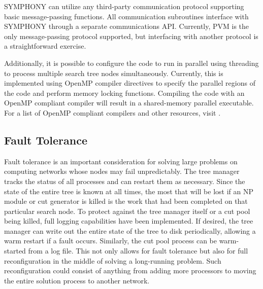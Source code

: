SYMPHONY can utilize any third-party communication protocol supporting basic
message-passing functions. All communication subroutines interface with
SYMPHONY through a separate communications API. Currently, PVM \cite{PVMbook}
is the only message-passing protocol supported, but interfacing with another
protocol is a straightforward exercise.

Additionally, it is possible to configure the code to run in parallel using
threading to process multiple search tree nodes simultaneously. Currently,
this is implemented using OpenMP compiler directives to specify the parallel
regions of the code and perform memory locking functions. Compiling the code
with an OpenMP compliant compiler will result in a shared-memory parallel
executable. For a list of OpenMP compliant compilers and other resources,
visit .

\subsection{Fault Tolerance}
\label{fault-tolerance} 

Fault tolerance is an important consideration for solving large problems on
computing networks whose nodes may fail unpredictably. The tree manager tracks
the status of all processes and can restart them as necessary. Since the state
of the entire tree is known at all times, the most that will be lost if an NP
module or cut generator is killed is the work that had been completed on that
particular search node. To protect against the tree manager itself or a cut
pool being killed, full logging capabilities have been implemented. If
desired, the tree manager can write out the entire state of the tree to disk
periodically, allowing a warm restart if a fault occurs. Similarly, the cut
pool process can be warm-started from a log file. This not only allows for
fault tolerance but also for full reconfiguration in the middle of solving a
long-running problem. Such reconfiguration could consist of anything from
adding more processors to moving the entire solution process to another
network.

